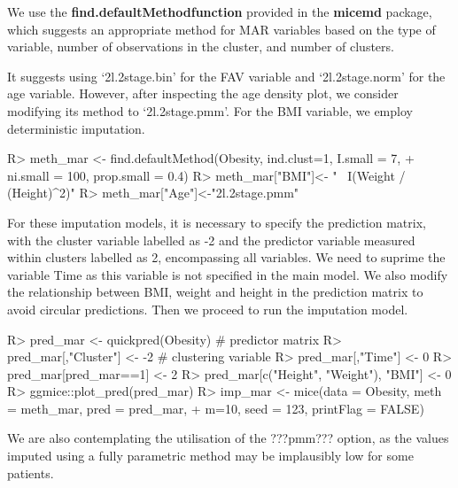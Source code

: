\documentclass[
]{jss}
\begin{document}
We use the \textbf{find.defaultMethodfunction} provided in the
\textbf{micemd} package, which suggests an appropriate method for MAR
variables based on the type of variable, number of observations in the
cluster, and number of clusters.

It suggests using `2l.2stage.bin' for the FAV variable and
`2l.2stage.norm' for the age variable. However, after inspecting the age
density plot, we consider modifying its method to `2l.2stage.pmm'. For
the BMI variable, we employ deterministic imputation.

\begin{CodeChunk}
\begin{CodeInput}
R> meth_mar <- find.defaultMethod(Obesity, ind.clust=1, I.small = 7,
+                                ni.small = 100, prop.small = 0.4)
R> meth_mar["BMI"]<- "~ I(Weight / (Height)^2)"
R> meth_mar["Age"]<-"2l.2stage.pmm" 
\end{CodeInput}
\end{CodeChunk}

For these imputation models, it is necessary to specify the prediction
matrix, with the cluster variable labelled as -2 and the predictor
variable measured within clusters labelled as 2, encompassing all
variables. We need to suprime the variable Time as this variable is not
specified in the main model. We also modify the relationship between
BMI, weight and height in the prediction matrix to avoid circular
predictions. Then we proceed to run the imputation model.

\begin{CodeChunk}
\begin{CodeInput}
R> pred_mar <- quickpred(Obesity)   # predictor matrix
R> pred_mar[,"Cluster"] <- -2 # clustering variable
R> pred_mar[,"Time"] <- 0
R> pred_mar[pred_mar==1] <- 2
R> pred_mar[c("Height", "Weight"), "BMI"] <- 0
R> ggmice::plot_pred(pred_mar)
R> imp_mar <- mice(data = Obesity, meth = meth_mar, pred = pred_mar,
+                 m=10, seed = 123, printFlag = FALSE)
\end{CodeInput}
\end{CodeChunk}

\begin{CodeChunk}
\end{CodeChunk}

We are also contemplating the utilisation of the ???pmm??? option, as
the values imputed using a fully parametric method may be implausibly
low for some patients.
\end{document}
